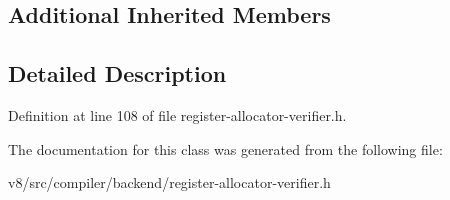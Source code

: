 \subsection*{Additional Inherited Members}


\subsection{Detailed Description}


Definition at line 108 of file register-\/allocator-\/verifier.\+h.



The documentation for this class was generated from the following file\+:\begin{DoxyCompactItemize}
\item 
v8/src/compiler/backend/register-\/allocator-\/verifier.\+h\end{DoxyCompactItemize}
